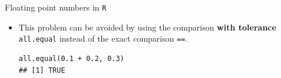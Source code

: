 \documentclass[11pt,compress,t,notes=noshow, xcolor=table]{beamer}
\begin{document}
\begin{vbframe}{Floating point numbers in \texttt{R}}
\begin{itemize}
\vspace{0.2cm}
\begin{verbatim}
sprintf("%.20f", 0.2)
## [1] "0.20000000000000001110"
\end{verbatim}

\vspace{0.2cm}
\begin{verbatim}
sprintf("%.20f", 0.1 + 0.2)
## [1] "0.30000000000000004441"
\end{verbatim}

\vspace{0.3cm}
\normalsize
\item This problem can be avoided by using the comparison \textbf{with tolerance} \texttt{all.equal} instead of the exact comparison \texttt{==}.
\footnotesize
\vspace{0.2cm}
\begin{verbatim}
all.equal(0.1 + 0.2, 0.3)
## [1] TRUE
\end{verbatim}


\end{itemize}
\normalsize
\end{vbframe}






\end{document}
